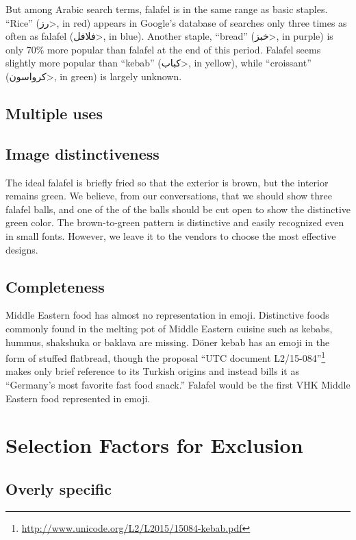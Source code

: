 \documentclass[a4paper,10pt]{article}
\begin{document}
But among Arabic search terms, falafel is in the same range as basic staples.  ``Rice''
(\<رز>, in red) appears in Google's database of searches only three times as often as
falafel (\<فلافل>, in blue).  Another staple, ``bread'' (\<خبز>, in purple) is only 70\% more
popular than falafel at the end of this period. Falafel seems slightly more popular than ``kebab'' (\<كباب>,
in yellow), while ``croissant'' (\<كرواسون>, in green) is largely unknown.


\subsection{Multiple uses}



\subsection{Image distinctiveness}
The ideal falafel is briefly fried so that the exterior is brown, but the interior remains green. We believe, from
our conversations, that we should show three falafel balls, and one of the of the balls should be cut open to show
the distinctive green color. The brown-to-green pattern is distinctive and easily recognized even in small fonts.
However, we leave it to the vendors to choose the most effective designs.

\subsection{Completeness}
Middle Eastern food has almost no representation in emoji. Distinctive foods
commonly found in the melting pot of Middle Eastern cuisine such as kebabs, hummus, shakshuka or
baklava are missing.  Döner kebab has an emoji in the form
of {\sc stuffed flatbread}, though the proposal ``UTC document
L2/15-084''\footnote{\url{http://www.unicode.org/L2/L2015/15084-kebab.pdf}} makes
only brief reference to its Turkish origins and instead bills it as ``Germany's most
favorite fast food snack.''  {\sc Falafel} would be the first VHK Middle Eastern food
represented in emoji.

\section{Selection Factors for Exclusion}

\subsection{Overly specific}
\end{document}
